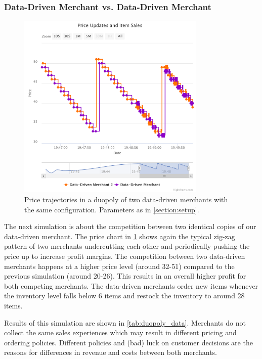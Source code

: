 \subsubsection{Data-Driven Merchant vs. Data-Driven Merchant}

\begin{figure}[t]
	\centering
	\includegraphics[width=0.8\textwidth]{figures/duopoly_data_prices}
	\caption[Price Trajectories: Data-Driven Merchant versus Data-Driven Merchant]{Price trajectories in a duopoly of two data-driven merchants with the same configuration. Parameters as in \cref{section:setup}.}
	\label{fig:duopoly_data_prices}
\end{figure}

The next simulation is about the competition between two identical copies of our data-driven merchant.
The price chart in \cref{fig:duopoly_data_prices} shows again the typical zig-zag pattern of two merchants undercutting each other and periodically pushing the price up to increase profit margins.
The competition between two data-driven merchants happens at a higher price level (around 32-51) compared to the previous simulation (around 20-26).
This results in an overall higher profit for both competing merchants.
The data-driven merchants order new items whenever the inventory level falls below 6 items and restock the inventory to around 28 items.

Results of this simulation are shown in \cref{tab:duopoly_data}.
Merchants do not collect the same sales experiences which may result in different pricing and ordering policies.
Different policies and (bad) luck on customer decisions are the reasons for differences in revenue and costs between both merchants.

